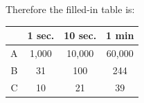 \begin{prob}
\begin{soln}
        Therefore the filled-in table is:

        \begin{center}
        \begin{tabular}{rccc}
            \toprule
            & 1 sec. & 10 sec. & 1 min\\ \midrule
            A & 1,000 & 10,000 & 60,000\\
            B & 31 & 100 & 244\\
            C & 10 & 21 & 39\\\bottomrule
        \end{tabular}
        \end{center}

    \end{soln}

\end{prob}
